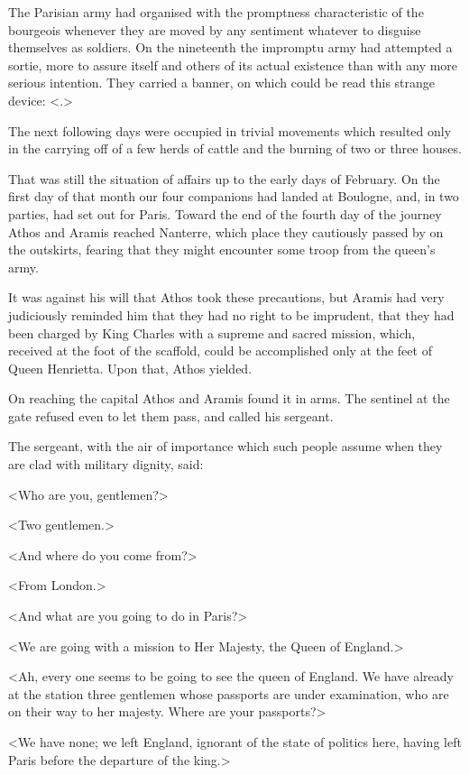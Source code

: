 The Parisian army had organised with the promptness characteristic of the bourgeois whenever they are moved by any sentiment whatever to disguise themselves as soldiers. On the nineteenth the impromptu army had attempted a sortie, more to assure itself and others of its actual existence than with any more serious intention. They carried a banner, on which could be read this strange device: <.>

The next following days were occupied in trivial movements which resulted only in the carrying off of a few herds of cattle and the burning of two or three houses.

That was still the situation of affairs up to the early days of February. On the first day of that month our four companions had landed at Boulogne, and, in two parties, had set out for Paris. Toward the end of the fourth day of the journey Athos and Aramis reached Nanterre, which place they cautiously passed by on the outskirts, fearing that they might encounter some troop from the queen's army.

It was against his will that Athos took these precautions, but Aramis had very judiciously reminded him that they had no right to be imprudent, that they had been charged by King Charles with a supreme and sacred mission, which, received at the foot of the scaffold, could be accomplished only at the feet of Queen Henrietta. Upon that, Athos yielded.

On reaching the capital Athos and Aramis found it in arms. The sentinel at the gate refused even to let them pass, and called his sergeant.

The sergeant, with the air of importance which such people assume when they are clad with military dignity, said:

<Who are you, gentlemen?>

<Two gentlemen.>

<And where do you come from?>

<From London.>

<And what are you going to do in Paris?>

<We are going with a mission to Her Majesty, the Queen of England.>

<Ah, every one seems to be going to see the queen of England. We have already at the station three gentlemen whose passports are under examination, who are on their way to her majesty. Where are your passports?>

<We have none; we left England, ignorant of the state of politics here, having left Paris before the departure of the king.>

